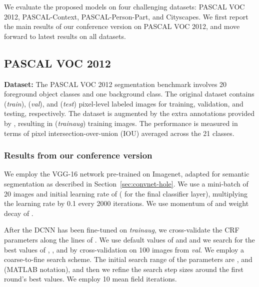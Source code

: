 \documentclass[10pt,journal,compsoc]{IEEEtran}
\begin{document}
We evaluate the proposed models on four challenging datasets: PASCAL VOC 2012,
PASCAL-Context, PASCAL-Person-Part, and Cityscapes. We first report the main
results of our conference version \cite{chen2014semantic} on PASCAL VOC 2012,
and move forward to latest results on all datasets.



\subsection{PASCAL VOC 2012}

\textbf{Dataset:} The PASCAL VOC 2012 segmentation benchmark
\cite{everingham2014pascal} involves 20 foreground object classes and one
background class. The original dataset contains  (\textit{train}),
 (\textit{val}), and  (\textit{test}) pixel-level labeled
images for training, validation, and testing, respectively. The dataset is
augmented by the extra annotations provided by \cite{hariharan2011semantic},
resulting in  (\textit{trainaug}) training images. The performance
is measured in terms of pixel intersection-over-union (IOU) averaged across
the 21 classes.

\subsubsection{Results from our conference version}

We employ the VGG-16 network pre-trained on Imagenet, adapted for semantic
segmentation as described in Section~\ref{sec:convnet-hole}. We use a
mini-batch of 20 images and initial learning rate of  (
for the final classifier layer), multiplying the learning rate by 0.1 every
2000 iterations. We use momentum of  and weight decay of .

After the DCNN has been fine-tuned on \textit{trainaug}, we cross-validate the
CRF parameters along the lines of \cite{krahenbuhl2011efficient}. We use default
values of  and  and we search for the best values of
, , and  by cross-validation on 100 images
from \textit{val}. We employ a coarse-to-fine search scheme. The initial search
range of the parameters are ,  and
 (MATLAB notation), and then we refine the search step
sizes around the first round's best values. We employ 10 mean field iterations.
\end{document}
